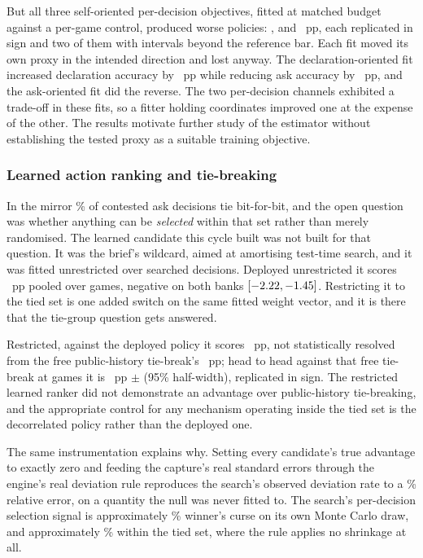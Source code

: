 But all three self-oriented per-decision objectives, fitted at matched budget against a per-game
control, produced worse policies: \vsevenKfourSelfDecl{}, \vsevenKfourSelfAsk{} and
\vsevenKfourSelfAlloc{}~pp, each replicated in sign and two of them with intervals beyond the
reference bar. Each fit moved its own proxy in the intended direction and lost anyway. The
declaration-oriented fit increased declaration accuracy by \vsevenKfourTradeGain{}~pp while
reducing ask accuracy by \vsevenKfourTradeCost{}~pp, and the ask-oriented fit did the reverse. The
two per-decision channels exhibited a trade-off in these fits, so a fitter holding
\vsevenCoordinates{} coordinates improved one at the expense of the other. The results motivate
further study of the estimator without establishing the tested proxy as a suitable training
objective.

\subsubsection{Learned action ranking and tie-breaking}
\label{sec:development-tie}

In the \vsix{} mirror \vsevenTieContested\% of contested ask decisions tie bit-for-bit, and the
open question was whether anything can be \emph{selected} within that set rather than merely
randomised. The learned candidate this cycle built was not built for that question. It was the
brief's wildcard, aimed at amortising test-time search, and it was fitted unrestricted over
\vsevenKfiveFitDecisions{} searched decisions. Deployed unrestricted it scores
\vsevenKfiveUnrestricted{}~pp pooled over \vsevenPhaseThreeCell{} games, negative on both banks
$[-2.22, -1.45]$. Restricting it to the tied set is one
added switch on the same fitted weight vector, and it is there that the tie-group question gets
answered.

Restricted, against the deployed policy it scores \vsevenKfiveTieOnly{}~pp, not statistically
resolved from the free public-history tie-break's \vsevenKfiveFreeTie{}~pp; head to head against
that free tie-break at \vsevenPhaseThreeCell{} games it is \vsevenKfiveHeadToHead{}~pp $\pm$
\vsevenKfivePm{} (95\% half-width), replicated in sign. The restricted learned ranker did not
demonstrate an advantage over public-history tie-breaking, and the appropriate control for any
mechanism operating inside the tied set is the decorrelated policy rather than the deployed one.

The same instrumentation explains why. Setting every candidate's true advantage to exactly zero and
feeding the capture's real standard errors through the engine's real deviation rule reproduces the
search's observed deviation rate to a \vsevenCurseRelErr\% relative error, on a quantity the null was
never fitted to. The search's per-decision selection signal is approximately \vsevenCurseShare\%
winner's curse on its own Monte Carlo draw, and approximately \vsevenCurseTieShare\% within the tied
set, where the rule applies no shrinkage at all.

